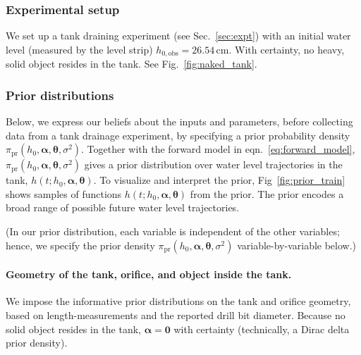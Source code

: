 \documentclass[openacc]{rsproca_new}%
\newcommand\themodel {$h(t; h_0, \boldsymbol \alpha, \boldsymbol\theta)$\xspace}
\begin{document}
\subsubsection{Experimental setup}
We set up a tank draining experiment (see Sec.~\ref{sec:expt}) with an initial water level (measured by the level strip) $h_{0, \text{obs}}=26.54$\,cm. 
With certainty, no heavy, solid object resides in the tank. 
See Fig.~\ref{fig:naked_tank}.

\subsubsection{Prior distributions} Below, we express our beliefs about the inputs and parameters, before collecting data from a tank drainage experiment, by specifying a prior probability density $\pi_{\text{pr}}(h_0, \boldsymbol \alpha, \boldsymbol \theta, \sigma^2)$.
Together with the forward model in eqn.~\ref{eq:forward_model}, $\pi_{\text{pr}}(h_0, \boldsymbol \alpha, \boldsymbol \theta, \sigma^2)$ gives a prior distribution over water level trajectories in the tank, \themodel. 
To visualize and interpret the prior, Fig~\ref{fig:prior_train} shows samples of functions \themodel from the prior. The prior encodes a broad range of possible future water level trajectories. 

(In our prior distribution, each variable is independent of the other variables; hence, we specify the prior density $\pi_{\text{pr}}(h_0, \boldsymbol \alpha, \boldsymbol \theta, \sigma^2)$ variable-by-variable below.)

\vspace{-\baselineskip}
\paragraph{Geometry of the tank, orifice, and object inside the tank.} 
We impose the informative prior distributions on the tank and orifice geometry, based on length-measurements and the reported drill bit diameter. 
Because no solid object resides in the tank, $\boldsymbol \alpha=\mathbf{0}$ with certainty (technically, a Dirac delta prior density).
\end{document}
